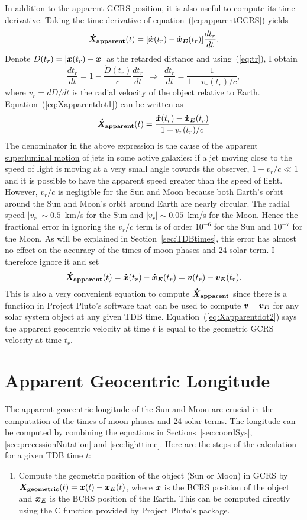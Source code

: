\documentclass[12pt]{article}
\newcommand \beq {\begin{equation}}
\newcommand \eeq {\end{equation}}
\newcommand{\ve}[1]{\mbox{\boldmath $#1$}}
\begin{document}
\begin{CJK}{UTF8}{bkai}
In addition to the apparent GCRS position, it is also useful to compute its time 
derivative. Taking the time derivative of equation~(\ref{eq:apparentGCRS}) yields 
\beq
  \ve{\dot{X}_{\rm apparent}}(t) = [ \ve{\dot{x}}(t_r) - \ve{\dot{x}_E}(t_r) ] 
\frac{dt_r}{dt} .
\label{eq:Xapparentdot1}
\eeq
Denote $D(t_r) = |\ve{x}(t_r)-\ve{x}|$ as the retarded distance and 
using~(\ref{eq:tr}), I obtain 
\beq
  \frac{dt_r}{dt} = 1 - \frac{\dot{D}(t_r)}{c} \frac{dt_r}{dt}
\ \ \Rightarrow \ \ \frac{dt_r}{dt} = \frac{1}{1+v_r(t_r)/c} , 
\eeq
where $v_r =dD/dt$ is the radial velocity of the object relative to Earth. 
Equation~(\ref{eq:Xapparentdot1}) can be written as 
\beq
  \ve{\dot{X}_{\rm apparent}}(t) = \frac{\ve{\dot{x}}(t_r) - \ve{\dot{x}_E}(t_r)}{1+v_r(t_r)/c}
\eeq
The denominator in the above expression is the cause of 
the apparent \href{https://en.wikipedia.org/wiki/Superluminal_motion}{superluminal motion} 
of jets in some active galaxies: if a jet moving close to the speed of light
is moving at a very small angle towards the observer, $1+v_r/c \ll 1$ and
it is possible to have the apparent speed greater than the speed of light. 
However, $v_r/c$ is negligible for the Sun and Moon because both Earth's orbit around the Sun 
and Moon's orbit around Earth are nearly circular. The radial speed 
$|v_r| \sim 0.5$~km/s for the Sun and $|v_r| \sim 0.05$~km/s for the Moon. 
Hence the fractional error in ignoring the $v_r/c$ term is of order $10^{-6}$ for 
the Sun and $10^{-7}$ for the Moon. As will be explained in Section~\ref{sec:TDBtimes}, 
this error has almost no effect on the accuracy of the times of moon phases 
and 24 solar term. I therefore ignore it and set 
\beq
  \ve{\dot{X}_{\rm apparent}}(t) = \ve{\dot{x}}(t_r) - \ve{\dot{x}_E}(t_r) 
= \ve{v}(t_r) - \ve{v_E}(t_r) .
\label{eq:Xapparentdot2}
\eeq
This is also a very convenient equation to compute $\ve{\dot{X}_{\rm apparent}}$ 
since there is a function in Project Pluto's software that can be used to 
compute $\ve{v}-\ve{v_E}$ for any solar system object at any given TDB time. 
Equation~(\ref{eq:Xapparentdot2}) says the apparent geocentric velocity 
at time $t$ is equal to the geometric GCRS velocity at time $t_r$.

\section{Apparent Geocentric Longitude}
\label{sec:longitude}

The apparent geocentric longitude of the Sun and Moon are crucial in the computation 
of the times of moon phases and 24 solar terms. The longitude can be computed by
combining the equations in Sections~\ref{sec:coordSys}, \ref{sec:precessionNutation}
and \ref{sec:lighttime}. Here are the steps of the calculation for a given 
TDB time $t$:
\begin{enumerate}
\item Compute the geometric position of the object (Sun or Moon) in GCRS 
by $\ve{X_{\rm geometric}}(t) = \ve{x}(t) - \ve{x_E}(t)$, where 
$\ve{x}$ is the BCRS position of the object and $\ve{x_E}$ is the BCRS 
position of the Earth. This can be computed directly using the C function provided 
by Project Pluto's package.


\end{enumerate}
\end{CJK}
\end{document}
